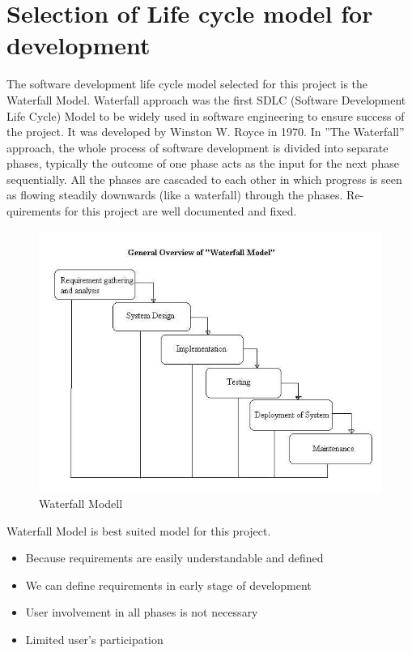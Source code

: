 \section{Selection of Life cycle model for development}
The software development life cycle model selected for this project is the Waterfall Model. Waterfall approach was the first SDLC (Software Development Life Cycle) Model to be widely used in software engineering to ensure success of the project. It was developed by Winston W. Royce in 1970. In ”The Waterfall” approach, the whole process of software development is divided into separate phases, typically the outcome of one phase acts as the input for the next phase sequentially. All the phases are cascaded to each other in which progress is seen as flowing steadily downwards (like a waterfall) through the phases. Re-quirements for this project are well documented and fixed.

\begin{figure}[H]
    \centering
    \includegraphics[scale=0.68]{introduction/Waterfall Model.jpg}
    \caption{ Waterfall Modell}
    \label{fig:my_label}
\end{figure}

Waterfall Model is best suited model for this project.
\begin{itemize}
\item Because requirements are easily understandable and defined
\item We can define requirements in early stage of development
\item User involvement in all phases is not necessary
\item Limited user’s participation
\end{itemize}
    
